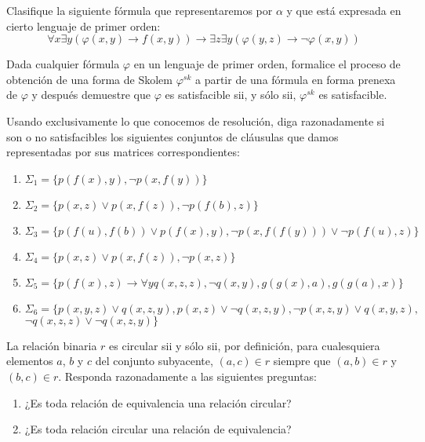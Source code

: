 \documentclass[12pt]{article}
\begin{document}
\begin{ejercicio}
    Clasifique la siguiente fórmula que representaremos por $\alpha$ y que está expresada en cierto lenguaje de primer orden:
    \[
        \forall x \exists y (\varphi(x,y) \rightarrow f(x,y)) \rightarrow \exists z \exists y (\varphi(y,z) \rightarrow \neg \varphi(x,y))
    \]
\end{ejercicio}

\begin{ejercicio}
    Dada cualquier fórmula $\varphi$ en un lenguaje de primer orden, formalice el proceso de obtención de una forma de Skolem $\varphi^{sk}$ a partir de una fórmula en forma prenexa de $\varphi$ y después demuestre que $\varphi$ es satisfacible sii, y sólo sii, $\varphi^{sk}$ es satisfacible.
\end{ejercicio}
\begin{ejercicio}
    Usando exclusivamente lo que conocemos de resolución, diga razonadamente si son o no satisfacibles los siguientes conjuntos de cláusulas que damos representadas por sus matrices correspondientes:
    \begin{enumerate}
        \item $\Sigma_1 = \{p(f(x), y), \neg p(x, f(y))\}$
        \item $\Sigma_2 = \{p(x, z) \lor p(x, f(z)), \neg p(f(b), z)\}$
        \item $\Sigma_3 = \{p(f(u), f(b)) \lor p(f(x), y), \neg p(x, f(f(y))) \lor \neg p(f(u), z)\}$
        \item $\Sigma_4 = \{p(x, z) \lor p(x, f(z)), \neg p(x, z)\}$
        \item $\Sigma_5 = \{p(f(x), z) \rightarrow \forall y q(x, z, z), \neg q(x, y), g(g(x), a), g(g(a), x)\}$
        \item $\Sigma_6 = \{p(x, y, z) \lor q(x, z, y), p(x, z) \lor \neg q(x, z, y), \neg p(x, z, y) \lor q(x, y, z),$\\$\neg q(x, z, z) \lor \neg q(x, z, y)\}$
    \end{enumerate}
\end{ejercicio}
\begin{ejercicio}
    La relación binaria $r$ es circular sii y sólo sii, por definición, para cualesquiera elementos $a$, $b$ y $c$ del conjunto subyacente, $(a, c) \in r$ siempre que $(a, b) \in r$ y $(b, c) \in r$. Responda razonadamente a las siguientes preguntas:
    \begin{enumerate}
        \item ¿Es toda relación de equivalencia una relación circular?
        \item ¿Es toda relación circular una relación de equivalencia?
    \end{enumerate}
\end{ejercicio}
\end{document}
